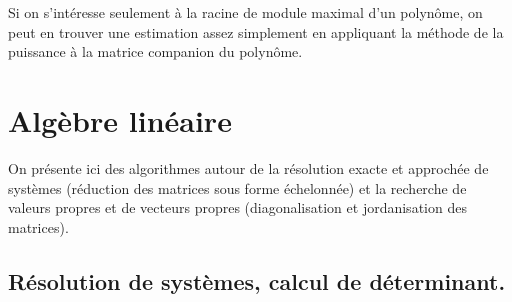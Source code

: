 \documentclass[a4paper,11pt]{article}
\begin{document}
Si on s'int\'eresse seulement \`a la racine de module maximal d'un
polyn\^ome, on peut
en trouver une estimation assez simplement en appliquant la m\'ethode
de la puissance \`a la matrice companion du polyn\^ome.

\section{Alg\`ebre lin\'eaire} \label{sec:linalg}
On présente ici des algorithmes autour de la résolution exacte
et approch\'ee de systèmes (réduction des matrices sous forme échelonnée) 
et la recherche de valeurs propres et de vecteurs propres 
(diagonalisation et jordanisation des matrices).

\subsection{R\'esolution de syst\`emes, calcul de d\'eterminant.}
\end{document}
